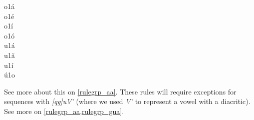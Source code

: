 \begin{multicols}{5}
{o1á \\ o1é \\ o1í \\ o1ó \\ 
u1á \\ u1ã \\ u1í \\ ú1o
}
\end{multicols}
See more about this on \cref{rulegrp_aa}. These rules will require exceptions for sequences with \emph{[qg]uV'} 
(where we used \emph{V'} to represent a vowel with a diacritic). See more on \cref{rulegrp_aa,rulegrp_gua}.

